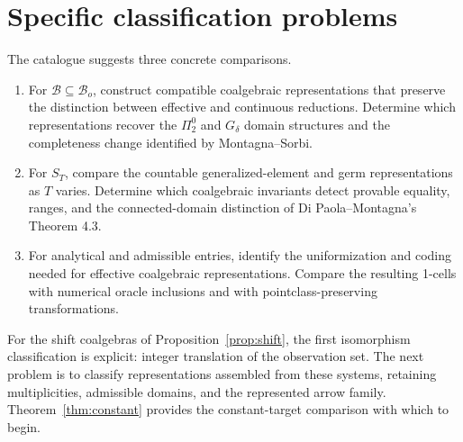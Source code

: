 \documentclass[11pt]{article}
\theoremstyle{definition}
\begin{document}
\section{Specific classification problems}

The catalogue suggests three concrete comparisons.
\begin{enumerate}[leftmargin=*,itemsep=6pt]
\item For $\mathcal B\subseteq\mathcal B_o$, construct compatible
coalgebraic representations that preserve the distinction between
effective and continuous reductions. Determine which representations
recover the $\Pi^0_2$ and $G_\delta$ domain structures and the
completeness change identified by Montagna--Sorbi.
\item For $S_T$, compare the countable generalized-element and germ
representations as $T$ varies. Determine which coalgebraic invariants
detect provable equality, ranges, and the connected-domain distinction
of Di Paola--Montagna's Theorem 4.3.
\item For analytical and admissible entries, identify the uniformization
and coding needed for effective coalgebraic representations. Compare
the resulting 1-cells with numerical oracle inclusions and with
pointclass-preserving transformations.
\end{enumerate}

For the shift coalgebras of Proposition~\ref{prop:shift}, the first
isomorphism classification is explicit: integer translation of the
observation set. The next problem is to classify representations
assembled from these systems, retaining multiplicities, admissible
domains, and the represented arrow family. Theorem~\ref{thm:constant}
provides the constant-target comparison with which to begin.
\end{document}
